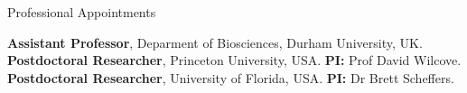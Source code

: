 \begin{rubric}{Professional Appointments}

%
	\textbf{Assistant Professor}, Deparment of Biosciences, Durham University, UK.
%
\entry*[2019 -- 2021]%
	\textbf{Postdoctoral Researcher}, Princeton University, USA. \textbf{PI:} Prof David Wilcove.
\entry*[2019]%
	\textbf{Postdoctoral Researcher}, University of Florida, USA. \textbf{PI:} Dr Brett Scheffers.
%
\end{rubric}
